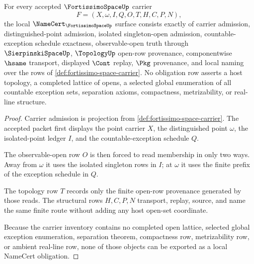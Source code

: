 \begin{theorem}
\label{thm:fortissimo-space-namecert-obligations}
For every accepted $\FortissimoSpaceUp$ carrier
$$
F=(X,\omega,I,Q,O,T,H,C,P,N),
$$
the local $\NameCert_{\FortissimoSpaceUp}$ surface consists exactly of carrier admission, distinguished-point admission, isolated singleton-open admission, countable-exception schedule exactness, observable-open truth through $\SierpinskiSpaceUp$, $\TopologyUp$ open-row provenance, componentwise $\hsame$ transport, displayed $\Cont$ replay, $\Pkg$ provenance, and local naming over the rows of \autoref{def:fortissimo-space-carrier}. No obligation row asserts a host topology, a completed lattice of opens, a selected global enumeration of all countable exception sets, separation axioms, compactness, metrizability, or real-line structure.
\end{theorem}
\begin{proof}
Carrier admission is projection from \autoref{def:fortissimo-space-carrier}. The accepted packet first displays the point carrier $X$, the distinguished point $\omega$, the isolated-point ledger $I$, and the countable-exception schedule $Q$.

The observable-open row $O$ is then forced to read membership in only two ways. Away from $\omega$ it uses the isolated singleton rows in $I$; at $\omega$ it uses the finite prefix of the exception schedule in $Q$.

The topology row $T$ records only the finite open-row provenance generated by those reads. The structural rows $H,C,P,N$ transport, replay, source, and name the same finite route without adding any host open-set coordinate.

Because the carrier inventory contains no completed open lattice, selected global exception enumeration, separation theorem, compactness row, metrizability row, or ambient real-line row, none of those objects can be exported as a local NameCert obligation.
\end{proof}

